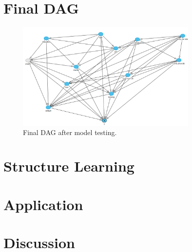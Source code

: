 \documentclass[11pt]{article}
\begin{document}
\section{Final DAG}
\label{sec:final_dag}
\begin{figure}[h]
	\centering
	\includegraphics[width=0.8\textwidth]{images/final_dag}
	\caption{Final DAG after model testing.}
	\label{fig:final_dag}
\end{figure}

\section{Structure Learning}

\section{Application}

\section{Discussion}

\newpage



\end{document}
